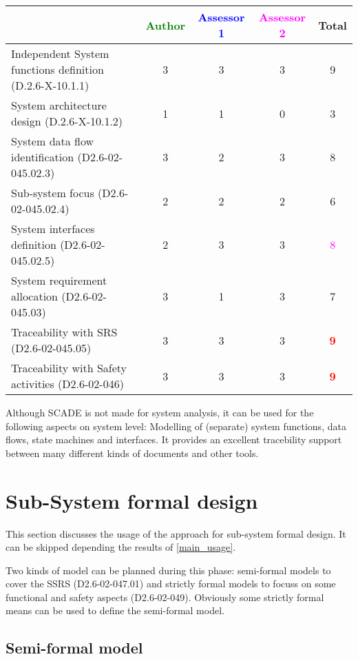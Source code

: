 \begin{tabular}{|l | c | c | c | c|}
\hline
& \textcolor{green}{Author} & \textcolor{blue}{Assessor 1} & \textcolor{magenta}{Assessor 2} & Total \\
\hline
Independent System functions definition (D.2.6-X-10.1.1)  &
3& 3    &3 &  9 \\
\hline 
System architecture design (D.2.6-X-10.1.2) & 1    & 1    &
0& 3     \\
\hline
System data flow identification (D2.6-02-045.02.3)  &
3& 2    &3 &  8 \\
\hline
Sub-system focus (D2.6-02-045.02.4)  &  2& 2    &2 &  6 \\
\hline
System interfaces definition (D2.6-02-045.02.5)  &
2& 3    &3 & \textcolor{magenta}{8}  \\
\hline
System requirement allocation (D2.6-02-045.03)  &  3&
1 &3 &  7 \\
\hline
Traceability with SRS (D2.6-02-045.05)  &  3& 3    &3 & \textcolor{red}{\textbf{9}}  \\
\hline
Traceability with Safety activities (D2.6-02-046)  &
3 & 3    &3 & \textcolor{red}{\textbf{9}}  \\
\hline
\end{tabular}

\begin{author_comment}
Although SCADE is not made for system analysis, it can be used for the following aspects on system level: Modelling of (separate) system functions, data flows, state machines and interfaces. It provides an excellent tracebility support between many different kinds of documents and other tools.  
\end{author_comment}


\section{Sub-System formal design}
This section discusses the usage of the approach for sub-system formal design.
It can be skipped depending the results of \ref{main_usage}.

Two kinds of model can be planned during this phase: semi-formal models to  cover the SSRS (D2.6-02-047.01) and strictly formal  models to  focuss on some functional and safety aspects (D2.6-02-049).  Obviously some strictly  formal means can be used to define the semi-formal  model.

\subsection{Semi-formal model}

